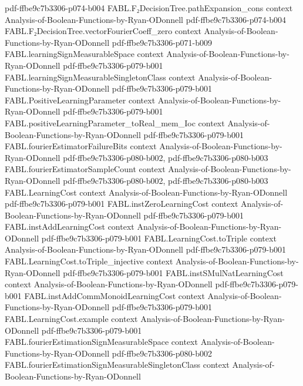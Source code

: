 \begin{theorem}
  {pdf-ffbe9c7b3306-p074-b004}
\proofstep
  {FABL.F₂DecisionTree.pathExpansion_cons}
  {context}
  {Analysis-of-Boolean-Functions-by-Ryan-ODonnell}
  {pdf-ffbe9c7b3306-p074-b004}
\proofstep
  {FABL.F₂DecisionTree.vectorFourierCoeff_zero}
  {context}
  {Analysis-of-Boolean-Functions-by-Ryan-ODonnell}
  {pdf-ffbe9c7b3306-p071-b009}
\proofstep
  {FABL.learningSignMeasurableSpace}
  {context}
  {Analysis-of-Boolean-Functions-by-Ryan-ODonnell}
  {pdf-ffbe9c7b3306-p079-b001}
\proofstep
  {FABL.learningSignMeasurableSingletonClass}
  {context}
  {Analysis-of-Boolean-Functions-by-Ryan-ODonnell}
  {pdf-ffbe9c7b3306-p079-b001}
\proofstep
  {FABL.PositiveLearningParameter}
  {context}
  {Analysis-of-Boolean-Functions-by-Ryan-ODonnell}
  {pdf-ffbe9c7b3306-p079-b001}
\proofstep
  {FABL.positiveLearningParameter_toReal_mem_Ioc}
  {context}
  {Analysis-of-Boolean-Functions-by-Ryan-ODonnell}
  {pdf-ffbe9c7b3306-p079-b001}
\proofstep
  {FABL.fourierEstimatorFailureBits}
  {context}
  {Analysis-of-Boolean-Functions-by-Ryan-ODonnell}
  {pdf-ffbe9c7b3306-p080-b002,
    pdf-ffbe9c7b3306-p080-b003}
\proofstep
  {FABL.fourierEstimatorSampleCount}
  {context}
  {Analysis-of-Boolean-Functions-by-Ryan-ODonnell}
  {pdf-ffbe9c7b3306-p080-b002,
    pdf-ffbe9c7b3306-p080-b003}
\proofstep
  {FABL.LearningCost}
  {context}
  {Analysis-of-Boolean-Functions-by-Ryan-ODonnell}
  {pdf-ffbe9c7b3306-p079-b001}
\proofstep
  {FABL.instZeroLearningCost}
  {context}
  {Analysis-of-Boolean-Functions-by-Ryan-ODonnell}
  {pdf-ffbe9c7b3306-p079-b001}
\proofstep
  {FABL.instAddLearningCost}
  {context}
  {Analysis-of-Boolean-Functions-by-Ryan-ODonnell}
  {pdf-ffbe9c7b3306-p079-b001}
\proofstep
  {FABL.LearningCost.toTriple}
  {context}
  {Analysis-of-Boolean-Functions-by-Ryan-ODonnell}
  {pdf-ffbe9c7b3306-p079-b001}
\proofstep
  {FABL.LearningCost.toTriple_injective}
  {context}
  {Analysis-of-Boolean-Functions-by-Ryan-ODonnell}
  {pdf-ffbe9c7b3306-p079-b001}
\proofstep
  {FABL.instSMulNatLearningCost}
  {context}
  {Analysis-of-Boolean-Functions-by-Ryan-ODonnell}
  {pdf-ffbe9c7b3306-p079-b001}
\proofstep
  {FABL.instAddCommMonoidLearningCost}
  {context}
  {Analysis-of-Boolean-Functions-by-Ryan-ODonnell}
  {pdf-ffbe9c7b3306-p079-b001}
\proofstep
  {FABL.LearningCost.example}
  {context}
  {Analysis-of-Boolean-Functions-by-Ryan-ODonnell}
  {pdf-ffbe9c7b3306-p079-b001}
\proofstep
  {FABL.fourierEstimationSignMeasurableSpace}
  {context}
  {Analysis-of-Boolean-Functions-by-Ryan-ODonnell}
  {pdf-ffbe9c7b3306-p080-b002}
\proofstep
  {FABL.fourierEstimationSignMeasurableSingletonClass}
  {context}
  {Analysis-of-Boolean-Functions-by-Ryan-ODonnell}

\end{theorem}

